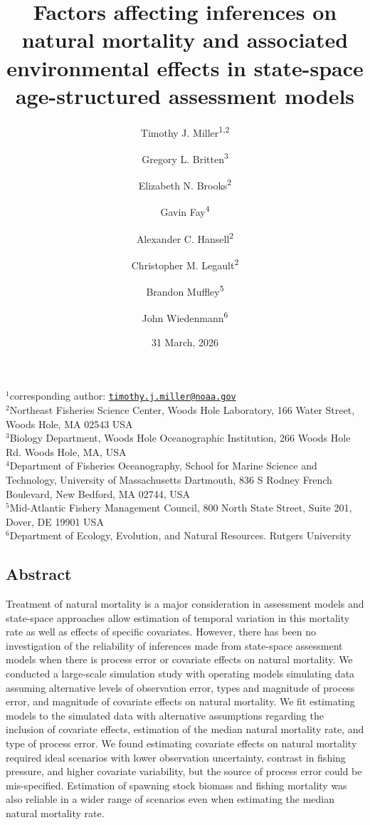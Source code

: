\documentclass[
  12pt,
]{article}
\title{Factors affecting inferences on natural mortality and associated environmental effects in state-space age-structured assessment models}
\author{Timothy J. Miller\textsuperscript{1,2} \and Gregory L. Britten\textsuperscript{3} \and Elizabeth N. Brooks\textsuperscript{2} \and Gavin Fay\textsuperscript{4} \and Alexander C. Hansell\textsuperscript{2} \and Christopher M. Legault\textsuperscript{2} \and Brandon Muffley\textsuperscript{5} \and John Wiedenmann\textsuperscript{6}}
\date{31 March, 2026}
\begin{document}
\maketitle

\(^1\)corresponding author: \href{mailto:timothy.j.miller@noaa.gov}{\nolinkurl{timothy.j.miller@noaa.gov}}\\
\(^2\)Northeast Fisheries Science Center, Woods Hole Laboratory, 166 Water Street, Woods Hole, MA 02543 USA\\
\(^3\)Biology Department, Woods Hole Oceanographic Institution, 266 Woods Hole Rd. Woods Hole, MA, USA\\
\(^4\)Department of Fisheries Oceanography, School for Marine Science and Technology, University of Massachusetts Dartmouth, 836 S Rodney French Boulevard, New Bedford, MA 02744, USA\\
\(^5\)Mid-Atlantic Fishery Management Council, 800 North State Street, Suite 201, Dover, DE 19901 USA\\
\(^6\)Department of Ecology, Evolution, and Natural Resources. Rutgers University\\

\pagebreak

\subsection*{Abstract}\label{abstract}

Treatment of natural mortality is a major consideration in assessment models and state-space approaches allow estimation of temporal variation in this mortality rate as well as effects of specific covariates. However, there has been no investigation of the reliability of inferences made from state-space assessment models when there is process error or covariate effects on natural mortality. We conducted a large-scale simulation study with operating models simulating data assuming alternative levels of observation error, types and magnitude of process error, and magnitude of covariate effects on natural mortality. We fit estimating models to the simulated data with alternative assumptions regarding the inclusion of covariate effects, estimation of the median natural mortality rate, and type of process error. We found estimating covariate effects on natural mortality required ideal scenarios with lower observation uncertainty, contrast in fishing pressure, and higher covariate variability, but the source of process error could be mis-specified. Estimation of spawning stock biomass and fishing mortality was also reliable in a wider range of scenarios even when estimating the median natural mortality rate.
\end{document}
